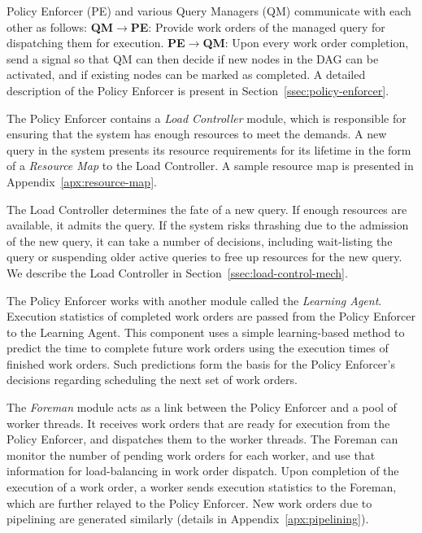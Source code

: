 Policy Enforcer (PE) and various Query Managers (QM) communicate with each other as follows:
\textbf{QM}$\rightarrow$\textbf{PE}: Provide work orders of the managed query for dispatching them for execution.
\textbf{PE}$\rightarrow$\textbf{QM}: Upon every work order completion, send a signal so that QM can then decide if new nodes in the DAG can be activated, and if existing nodes can be marked as completed.
A detailed description of the Policy Enforcer is present in Section~\ref{ssec:policy-enforcer}. 

The Policy Enforcer contains a \textit{Load Controller} module, which is
responsible for ensuring that the system has enough resources to meet the
demands.
A new query in the system presents its resource requirements for its lifetime in the form of a \textit{Resource Map} to the Load Controller.
A sample resource map is presented in Appendix~\ref{apx:resource-map}.

The Load Controller determines the fate of a new query. 
If enough resources are available, it admits the query.
If the system risks thrashing due to the admission of the new query, it can take a number of decisions, including wait-listing the query or suspending older active queries to free up resources for the new query.
We describe the Load Controller in Section~\ref{ssec:load-control-mech}.

The Policy Enforcer works with another module called the \textit{Learning Agent}. 
Execution statistics of completed work orders are passed from the Policy Enforcer to the Learning Agent.
This component uses a simple learning-based method to predict the time to 
complete future work orders using the execution times of finished work orders. 
Such predictions form the basis for the Policy Enforcer's decisions regarding scheduling the next set of work orders. 

The \textit{Foreman} module acts as a link between the Policy Enforcer and a pool of worker threads. 
It receives work orders that are ready for execution from the Policy Enforcer, and dispatches them to the worker threads. 
The Foreman can monitor the number of pending work orders for each worker, and 
use that information for load-balancing in work order dispatch.
Upon completion of the execution of a work order, a worker sends execution statistics to the Foreman, which are further relayed to the Policy Enforcer.
New work orders due to pipelining are generated similarly (details in Appendix~\ref{apx:pipelining}).

